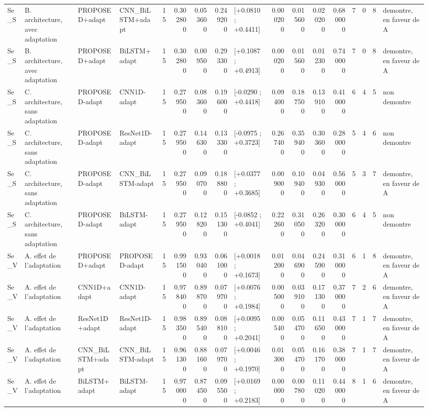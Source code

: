 \begin{tabular}{llllrrrrlrrrrrrrl}
Se_S & B. architecture, avec adaptation & PROPOSED+adapt & CNN_BiLSTM+adapt & 15 & 0.302800 & 0.053600 & 0.249200 & [+0.0810 ; +0.4411] & 0.000200 & 0.015600 & 0.020200 & 0.680000 & 7 & 0 & 8 & demontre, en faveur de A \\
Se_S & B. architecture, avec adaptation & PROPOSED+adapt & BiLSTM+adapt & 15 & 0.302800 & 0.009500 & 0.293300 & [+0.1087 ; +0.4913] & 0.000200 & 0.015600 & 0.012300 & 0.740000 & 7 & 0 & 8 & demontre, en faveur de A \\
Se_S & C. architecture, sans adaptation & PROPOSED-adapt & CNN1D-adapt & 15 & 0.279500 & 0.083600 & 0.196000 & [-0.0290 ; +0.4418] & 0.094000 & 0.187500 & 0.139100 & 0.410000 & 6 & 4 & 5 & non demontre \\
Se_S & C. architecture, sans adaptation & PROPOSED-adapt & ResNet1D-adapt & 15 & 0.279500 & 0.146300 & 0.133300 & [-0.0975 ; +0.3723] & 0.267400 & 0.359400 & 0.303600 & 0.280000 & 5 & 4 & 6 & non demontre \\
Se_S & C. architecture, sans adaptation & PROPOSED-adapt & CNN_BiLSTM-adapt & 15 & 0.279500 & 0.090700 & 0.188800 & [+0.0377 ; +0.3685] & 0.009000 & 0.109400 & 0.049300 & 0.560000 & 5 & 3 & 7 & demontre, en faveur de A \\
Se_S & C. architecture, sans adaptation & PROPOSED-adapt & BiLSTM-adapt & 15 & 0.279500 & 0.128200 & 0.151300 & [-0.0852 ; +0.4041] & 0.222600 & 0.310500 & 0.263200 & 0.300000 & 6 & 4 & 5 & non demontre \\
Se_V & A. effet de l'adaptation & PROPOSED+adapt & PROPOSED-adapt & 15 & 0.991500 & 0.930400 & 0.061000 & [+0.0018 ; +0.1673] & 0.012000 & 0.046900 & 0.245900 & 0.310000 & 6 & 1 & 8 & demontre, en faveur de A \\
Se_V & A. effet de l'adaptation & CNN1D+adapt & CNN1D-adapt & 15 & 0.978400 & 0.898700 & 0.079700 & [+0.0076 ; +0.1984] & 0.005000 & 0.039100 & 0.171300 & 0.370000 & 7 & 2 & 6 & demontre, en faveur de A \\
Se_V & A. effet de l'adaptation & ResNet1D+adapt & ResNet1D-adapt & 15 & 0.983500 & 0.895400 & 0.088100 & [+0.0095 ; +0.2041] & 0.005400 & 0.054700 & 0.116500 & 0.430000 & 7 & 1 & 7 & demontre, en faveur de A \\
Se_V & A. effet de l'adaptation & CNN_BiLSTM+adapt & CNN_BiLSTM-adapt & 15 & 0.961300 & 0.881600 & 0.079700 & [+0.0046 ; +0.1970] & 0.013000 & 0.054700 & 0.161700 & 0.380000 & 7 & 1 & 7 & demontre, en faveur de A \\
Se_V & A. effet de l'adaptation & BiLSTM+adapt & BiLSTM-adapt & 15 & 0.970000 & 0.874500 & 0.095500 & [+0.0169 ; +0.2183] & 0.000000 & 0.007800 & 0.110200 & 0.440000 & 8 & 1 & 6 & demontre, en faveur de A \\

\end{tabular}
